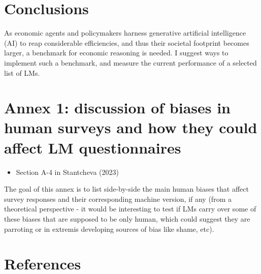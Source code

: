 \documentclass[
]{article}
\providecommand{\tightlist}{%
  \setlength{\itemsep}{0pt}\setlength{\parskip}{0pt}}\usepackage{longtable,booktabs,array}
\begin{document}
\section{Conclusions}\label{conclusions}

As economic agents and policymakers harness generative artificial
intelligence (AI) to reap considerable efficiencies, and thus their
societal footprint becomes larger, a benchmark for economic reasoning is
needed. I suggest ways to implement such a benchmark, and measure the
current performance of a selected list of LMs.

\section{Annex 1: discussion of biases in human surveys and how they
could affect LM
questionnaires}\label{annex-1-discussion-of-biases-in-human-surveys-and-how-they-could-affect-lm-questionnaires}

\begin{itemize}
\tightlist
\item
  Section A-4 in Stantcheva (2023)
\end{itemize}

The goal of this annex is to list side-by-side the main human biases
that affect survey responses and their corresponding machine version, if
any (from a theoretical perspective - it would be interesting to test if
LMs carry over some of these biases that are supposed to be only human,
which could suggest they are parroting or in extremis developing sources
of bias like shame, etc).

\section*{References}\label{references}
\end{document}
